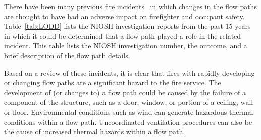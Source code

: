 \documentclass[12pt,oneside]{book}
\begin{document}
There have been many previous fire incidents~\cite{NIOSH:Pettit,NIOSH:Washenitz,NIOSH:Mezzanotte,NIOSH:McFall,NIOSH:McFall2,NIOSH:McFall3,NIOSH:Berardinelli,NIOSH:Koedam,NIOSH:McFall4,NIOSH:Tarley,NIOSH:Braddee,NIOSH:Merinar,NIOSH:Bowyer2,NIOSH:Loflin,NIOSH:Bowyer} in which changes in the flow paths are thought to have had an adverse impact on firefighter and occupant safety. Table~\ref{tab:LODD} lists the NIOSH investigation reports from the past 15 years in which it could be determined that a flow path played a role in the related incident. This table lists the NIOSH investigation number, the outcome, and a brief description of the flow path details.

Based on a review of these incidents, it is clear that fires with rapidly developing or changing flow paths are a significant hazard to the fire service. The development of (or changes to) a flow path could be caused by the failure of a component of the structure, such as a door, window, or portion of a ceiling, wall or floor. Environmental conditions such as wind can generate hazardous thermal conditions within a flow path. Uncoordinated ventilation procedures can also be the cause of increased thermal hazards within a flow path.
\end{document}
